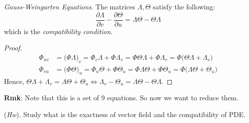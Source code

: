 \begin{theorem}
\textit{Gauss-Weingarten Equations}. The matrices $\Lambda, \Theta$ satisfy the following:
\[
\frac{\partial\Lambda}{\partial v} - \frac{\partial\Theta}{\partial u} = \Lambda\Theta - \Theta\Lambda
\]
which is the \textit{compatibility condition}.
\end{theorem}

\begin{proof}
\begin{align*}
    \Phi_{uv} &= \big(\Phi\Lambda\big)_v = \Phi_v\Lambda + \Phi\Lambda_v = \Phi\Theta\Lambda + \Phi\Lambda_v = \Phi\big(\Theta\Lambda + \Lambda_v\big)\\
    \Phi_{vu} &= \big(\Phi\Theta\big)_u = \Phi_u\Theta + \Phi\Theta_u = \Phi\Lambda\Theta + \Phi\Theta_u = \Phi\big(\Lambda\Theta + \Theta_u\big)
\end{align*}
Hence, $\Theta\Lambda + \Lambda_v = \Lambda\Theta + \Theta_u \iff \Lambda_v - \Theta_u = \Lambda\Theta - \Theta\Lambda$.
\end{proof}

\noindent\textbf{Rmk}: Note that this is a set of 9 equations. So now we want to reduce them.

\noindent (\textit{Hw}). Study what is the exactness of vector field and the compatibility of PDE.
